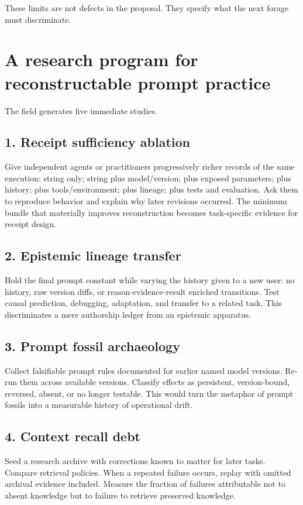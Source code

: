 \documentclass[11pt]{article}
\begin{document}
These limits are not defects in the proposal. They specify what the next forage must discriminate.

\section{A research program for reconstructable prompt practice}

The field generates five immediate studies.

\subsection*{1. Receipt sufficiency ablation}
Give independent agents or practitioners progressively richer records of the same execution: string only; string plus model/version; plus exposed parameters; plus history; plus tools/environment; plus lineage; plus tests and evaluation. Ask them to reproduce behavior and explain why later revisions occurred. The minimum bundle that materially improves reconstruction becomes task-specific evidence for receipt design.

\subsection*{2. Epistemic lineage transfer}
Hold the final prompt constant while varying the history given to a new user: no history, raw version diffs, or reason-evidence-result enriched transitions. Test causal prediction, debugging, adaptation, and transfer to a related task. This discriminates a mere authorship ledger from an epistemic apparatus.

\subsection*{3. Prompt fossil archaeology}
Collect falsifiable prompt rules documented for earlier named model versions. Re-run them across available versions. Classify effects as persistent, version-bound, reversed, absent, or no longer testable. This would turn the metaphor of prompt fossils into a measurable history of operational drift.

\subsection*{4. Context recall debt}
Seed a research archive with corrections known to matter for later tasks. Compare retrieval policies. When a repeated failure occurs, replay with omitted archival evidence included. Measure the fraction of failures attributable not to absent knowledge but to failure to retrieve preserved knowledge.
\end{document}

